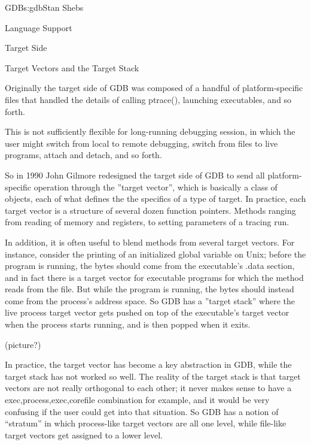 \begin{aosachapter}{GDB}{s:gdb}{Stan Shebs}
\begin{aosasect1}{Language Support}
\end{aosasect1}

\begin{aosasect1}{Target Side}

\end{aosasect1}

\begin{aosasect1}{Target Vectors and the Target Stack}

Originally the target side of GDB was composed of a handful of
platform-specific files that handled the details of calling ptrace(),
launching executables, and so forth.

This is not sufficiently flexible for long-running debugging session,
in which the user might switch from local to remote debugging, switch
from files to live programs, attach and detach, and so forth.

So in 1990 John Gilmore redesigned the target side of GDB to send all
platform-specific operation through the ''target vector'', which is
basically a class of objects, each of what defines the the specifics
of a type of target.  In practice, each target vector is a structure
of several dozen function pointers.  Methods ranging from reading of
memory and registers, to setting parameters of a tracing run.

In addition, it is often useful to blend methods from several target
vectors.  For instance, consider the printing of an initialized global
variable on Unix; before the program is running, the bytes should come
from the executable's .data section, and in fact there is a target
vector for executable programs for which the method reads from the
file.  But while the program is running, the bytes should instead come
from the process's address space.  So GDB has a ''target stack'' where
the live process target vector gets pushed on top of the executable's
target vector when the process starts running, and is then popped when
it exits.

(picture?)

In practice, the target vector has become a key abstraction in GDB,
while the target stack has not worked so well.  The reality of the
target stack is that target vectors are not really orthogonal to each
other; it never makes sense to have a exec,process,exec,corefile
combination for example, and it would be very confusing if the user
could get into that situation.  So GDB has a notion of ``stratum'' in
which process-like target vectors are all one level, while file-like
target vectors get assigned to a lower level.


\end{aosasect1}
\end{aosachapter}
